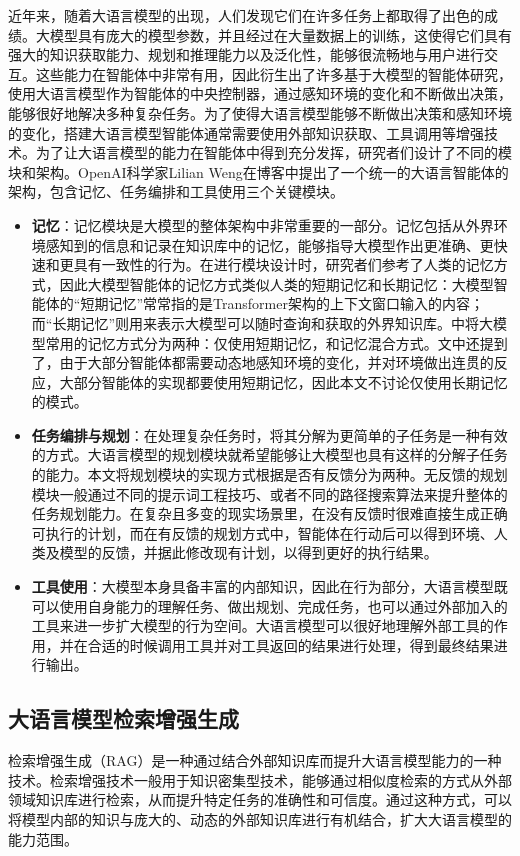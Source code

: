 近年来，随着大语言模型的出现，人们发现它们在许多任务上都取得了出色的成绩。大模型具有庞大的模型参数，并且经过在大量数据上的训练，这使得它们具有强大的知识获取能力、规划和推理能力以及泛化性，能够很流畅地与用户进行交互\cite{Wang2023c}。这些能力在智能体中非常有用，因此衍生出了许多基于大模型的智能体研究，使用大语言模型作为智能体的中央控制器，通过感知环境的变化和不断做出决策，能够很好地解决多种复杂任务。为了使得大语言模型能够不断做出决策和感知环境的变化，搭建大语言模型智能体通常需要使用外部知识获取、工具调用等增强技术。为了让大语言模型的能力在智能体中得到充分发挥，研究者们设计了不同的模块和架构。OpenAI科学家Lilian Weng在博客\cite{Weng2023}中提出了一个统一的大语言智能体的架构，包含记忆、任务编排和工具使用三个关键模块。

\begin{itemize}
    \item \textbf{记忆}：记忆模块是大模型的整体架构中非常重要的一部分。记忆包括从外界环境感知到的信息和记录在知识库中的记忆，能够指导大模型作出更准确、更快速和更具有一致性的行为。在进行模块设计时，研究者们参考了人类的记忆方式，因此大模型智能体的记忆方式类似人类的短期记忆和长期记忆：大模型智能体的“短期记忆”常常指的是Transformer\cite{Ge2024}架构的上下文窗口输入的内容；而“长期记忆”则用来表示大模型可以随时查询和获取的外界知识库。\cite{Wang2023c}中将大模型常用的记忆方式分为两种：仅使用短期记忆，和记忆混合方式。文中还提到了，由于大部分智能体都需要动态地感知环境的变化，并对环境做出连贯的反应，大部分智能体的实现都要使用短期记忆，因此本文不讨论仅使用长期记忆的模式。
    \item \textbf{任务编排与规划}：在处理复杂任务时，将其分解为更简单的子任务是一种有效的方式。大语言模型的规划模块就希望能够让大模型也具有这样的分解子任务的能力。本文将规划模块的实现方式根据是否有反馈分为两种。无反馈的规划模块一般通过不同的提示词工程技巧、或者不同的路径搜索算法来提升整体的任务规划能力。在复杂且多变的现实场景里，在没有反馈时很难直接生成正确可执行的计划，而在有反馈的规划方式中，智能体在行动后可以得到环境、人类及模型的反馈，并据此修改现有计划，以得到更好的执行结果。 
    \item \textbf{工具使用}：大模型本身具备丰富的内部知识，因此在行为部分，大语言模型既可以使用自身能力的理解任务、做出规划、完成任务，也可以通过外部加入的工具来进一步扩大模型的行为空间。大语言模型可以很好地理解外部工具的作用，并在合适的时候调用工具并对工具返回的结果进行处理，得到最终结果进行输出。
  \end{itemize}

\subsection{大语言模型检索增强生成}
检索增强生成（RAG）是一种通过结合外部知识库而提升大语言模型能力的一种技术。检索增强技术一般用于知识密集型技术，能够通过相似度检索的方式从外部领域知识库进行检索，从而提升特定任务的准确性和可信度。通过这种方式，可以将模型内部的知识与庞大的、动态的外部知识库进行有机结合，扩大大语言模型的能力范围。

